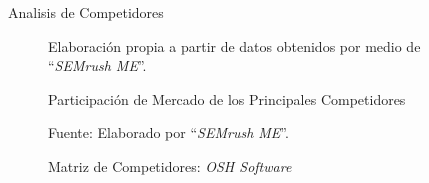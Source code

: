 \documentclass[spanish]{beamer} %
\begin{document}
\begin{frame}[allowframebreaks]{Analisis de Competidores}

  \begin{figure}[htb]
    \centering
    \caption{\footnotesize Participación de Mercado de los Principales Competidores}
    \footnotesize{{Elaboración propia a partir de datos obtenidos por medio de ``\textit{SEMrush ME}''.}}
    \label{fig:visitas_por_dominio}
  \end{figure}

  \begin{figure}[htb]
    \centering
    \caption{Matriz de Competidores: \textit{OSH Software}}
	  \footnotesize{Fuente: Elaborado por ``\textit{SEMrush ME}''.}
    \label{fig:MatrizCompetidores}
  \end{figure}

\end{frame}
\end{document}
